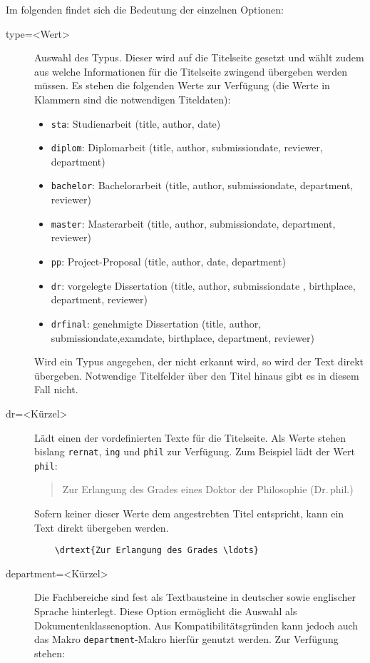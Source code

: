 \documentclass[
	ngerman,
	ruledheaders=chapter,%
	class=book,%
	thesis={
		type=dr,
		dr=rernat
	},
	accentcolor=9c,%
	custommargins=true,%
	marginpar=false,%
	fontsize=11pt,%
]{tudapub}
\let\code\texttt
\begin{document}
Im folgenden findet sich die Bedeutung der einzelnen Optionen:
\begin{description}
\item[type=<Wert>] Auswahl des Typus. Dieser wird auf die Titelseite gesetzt und wählt zudem aus welche Informationen für die Titelseite zwingend übergeben werden müssen.
	Es stehen die folgenden Werte zur Verfügung (die Werte in Klammern sind die notwendigen Titeldaten):
	\begin{itemize}
	\item \code{sta}: Studienarbeit (title, author, date)
	\item \code{diplom}: Diplomarbeit (title, author, submissiondate, reviewer, department)
	\item \code{bachelor}: Bachelorarbeit (title, author, submissiondate, department, reviewer)
	\item \code{master}: Masterarbeit (title, author, submissiondate, department, reviewer)
	\item \code{pp}: Project-Proposal  (title, author, date, department)
	\item \code{dr}: vorgelegte Dissertation (title, author, submissiondate , birthplace, department, reviewer)
	\item \code{drfinal}: genehmigte Dissertation (title, author, submissiondate,examdate, birthplace, department, reviewer)
	\end{itemize}
	Wird ein Typus angegeben, der nicht erkannt wird, so wird der Text direkt übergeben. Notwendige Titelfelder über den Titel hinaus gibt es in diesem Fall nicht.
\item[dr=<Kürzel>] Lädt einen der vordefinierten Texte für die Titelseite. Als Werte stehen bislang \code{rernat}, \code{ing} und \code{phil} zur Verfügung. Zum Beispiel lädt der Wert \code{phil}:
	\begin{quote}
	Zur Erlangung des Grades eines Doktor der Philosophie (Dr.\,phil.)
	\end{quote}
	Sofern keiner dieser Werte dem angestrebten Titel entspricht, kann ein Text direkt übergeben werden.
	\begin{verbatim}
	\drtext{Zur Erlangung des Grades \ldots}
	\end{verbatim}
\item[department=<Kürzel>] Die Fachbereiche sind fest als Textbausteine in deutscher sowie englischer Sprache hinterlegt. Diese Option ermöglicht die Auswahl als Dokumentenklassenoption. Aus Kompatibilitätsgründen kann jedoch auch das Makro \code{department}-Makro hierfür genutzt werden. Zur Verfügung stehen:\par

\end{description}
\end{document}
